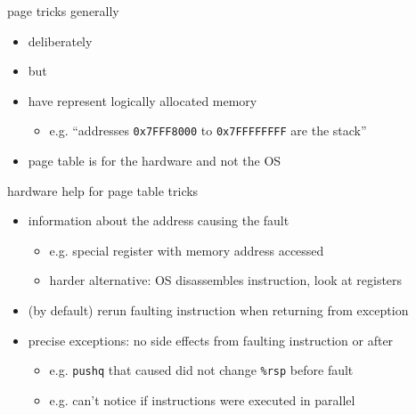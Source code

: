 \begin{frame}{page tricks generally}
\begin{itemize}
\item deliberately 
\item but 
\vspace{.5cm}
\item have  represent logically allocated memory
    \begin{itemize}
    \item e.g. ``addresses {\tt 0x7FFF8000} to {\tt 0x7FFFFFFFF} are the stack''
    \end{itemize}
\item page table is for the hardware and not the OS
\end{itemize}
\end{frame}

\begin{frame}{hardware help for page table tricks}
\begin{itemize}
\item information about the address causing the fault
    \begin{itemize}
    \item e.g. special register with memory address accessed
    \item harder alternative: OS disassembles instruction, look at registers
    \end{itemize}
\item (by default) rerun faulting instruction when returning from exception
\item precise exceptions: no side effects from faulting instruction or after
    \begin{itemize}
    \item e.g. {\tt pushq} that caused did not change {\tt \%rsp} before fault
    \item e.g. can't notice if instructions were executed in parallel
    \end{itemize}
\end{itemize}
\end{frame}
